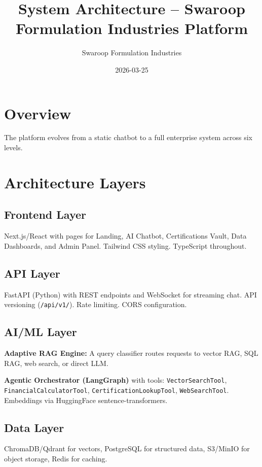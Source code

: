 \documentclass{article}
\title{System Architecture -- Swaroop Formulation Industries Platform}
\author{Swaroop Formulation Industries}
\date{2026-03-25}
\begin{document}
\maketitle

\section{Overview}

The platform evolves from a static chatbot to a full enterprise system across six levels.

\section{Architecture Layers}

\subsection{Frontend Layer}

Next.js/React with pages for Landing, AI Chatbot, Certifications Vault, Data Dashboards, and Admin Panel. Tailwind CSS styling. TypeScript throughout.

\subsection{API Layer}

FastAPI (Python) with REST endpoints and WebSocket for streaming chat. API versioning (\texttt{/api/v1/}). Rate limiting. CORS configuration.

\subsection{AI/ML Layer}

\textbf{Adaptive RAG Engine:} A query classifier routes requests to vector RAG, SQL RAG, web search, or direct LLM.

\textbf{Agentic Orchestrator (LangGraph)} with tools: \texttt{VectorSearchTool}, \texttt{FinancialCalculatorTool}, \texttt{CertificationLookupTool}, \texttt{WebSearchTool}. Embeddings via HuggingFace sentence-transformers.

\subsection{Data Layer}

ChromaDB/Qdrant for vectors, PostgreSQL for structured data, S3/MinIO for object storage, Redis for caching.
\end{document}
